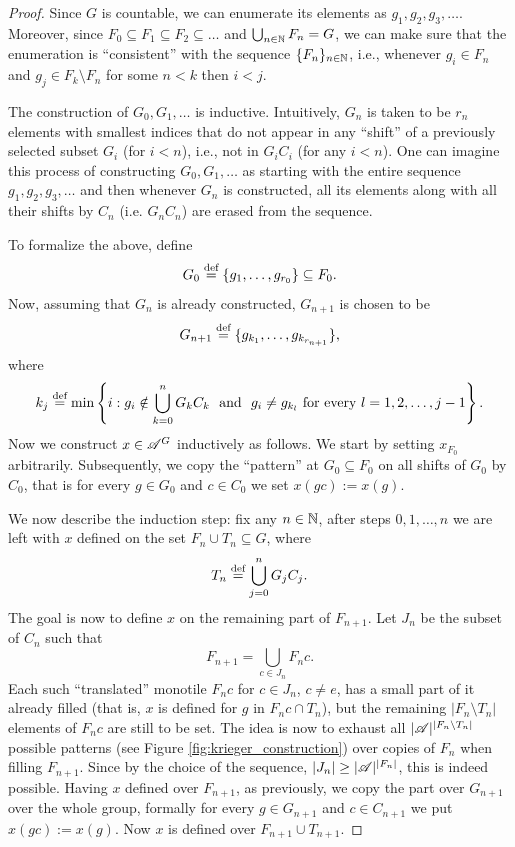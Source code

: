 \begin{proof}
Since $G$ is countable, we can enumerate its elements as $g_1, g_2, g_3,\ldots$.
%
Moreover, since $F_0 \subseteq F_1 \subseteq F_2 \subseteq \ldots$ and $\bigcup_{n\in \mathbb{N}} F_n = G$, we can make sure that the enumeration is ``consistent'' with the \Folner sequence $\{F_n\}_{n\in \mathbb{N}}$, i.e., whenever $g_i \in F_n$ and $g_j \in F_k \setminus F_n$ for some $n<k$ then $i<j$. 

The construction of $G_0,G_1,\ldots$ is inductive. Intuitively, $G_n$ is taken to be $r_n$ elements with smallest indices that do not appear in any ``shift'' of a previously selected subset $G_i$ (for $i<n$), i.e., not in $G_iC_i$ (for any $i<n$). One can imagine this process of constructing $G_0,G_1,\ldots$ as starting with the entire sequence $g_1,g_2,g_3,\ldots$ and then whenever $G_n$ is constructed, all its elements along with all their shifts by $C_n$ (i.e. $G_nC_n$) are erased from the sequence.

To formalize the above, define 
\[
G_0 \stackrel{\textup{def}}{=} \{g_1,\ldots, g_{r_0}\}\subseteq F_0.
\]
Now, assuming that $G_n$ is already constructed, $G_{n+1}$ is chosen to be 
\[
G_{n+1} \stackrel{\textup{def}}{=} \{g_{k_1},\ldots, g_{k_{r_{n+1}}}\},
\]
where 
\[
k_j \stackrel{\textup{def}}{=} \min\left\{i : g_i\notin \bigcup_{k=0}^nG_kC_k ~\mbox{ and }~ g_i \neq g_{k_l} \mbox{ for every } l=1,2, \ldots, j-1\right\}.
\]
 Now we construct $x\in\mathscr{A}^G$ inductively as follows. 
We start by setting $x_{F_0}$ arbitrarily.
%
Subsequently, we copy the ``pattern'' at $G_0\subseteq F_0$ on all shifts of $G_0$ by $C_0$, that is for every $g\in G_0$ and $c \in C_0$ we set $x(gc):= x(g)$.
%

We now describe the induction step: fix any $n\in \mathbb{N}$, after steps $0,1,\ldots, n$ we are left with $x$ defined  on the set $F_n \cup T_n \subseteq G$, where 
 \[
 T_n\stackrel{\textup{def}}{=}\bigcup_{j=0}^n G_jC_j.
 \] 
The goal is now to define $x$ on the remaining part of $F_{n+1}$.
%
Let $J_n$ be the subset of $C_n$ such that
$$F_{n+1} = \bigcup_{c\in J_n} F_n c.$$
Each such ``translated'' monotile $F_nc$ for $c\in J_n$, $c\neq e$, has a small part of it already filled (that is, $x$ is defined for $g$ in $F_nc\cap T_n$), but the remaining $|F_n \setminus T_n|$ elements of $F_nc$ are still to be set.
%
The idea is now to exhaust all $|\mathscr{A}|^{|F_n \setminus T_n|}$ possible patterns (see Figure \ref{fig:krieger_construction}) over copies of $F_n$ when filling $F_{n+1}$.
%
Since by the choice of the \Folner sequence, $|J_n|\geq |\mathscr{A}|^{|F_n|}$, this is indeed possible.
%
Having $x$ defined over $F_{n+1}$, as previously, we copy the part over $G_{n+1}$ over the whole group, formally for every $g\in G_{n+1}$ and $c\in C_{n+1}$ we put $x(gc):= x(g)$.
%
Now $x$ is defined over $F_{n+1} \cup T_{n+1}$.


\end{proof}
